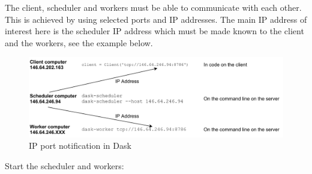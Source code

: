 The client, scheduler and workers must be able to communicate with each other. This is achieved by using selected ports and IP addresses. The main IP address of interest here is the scheduler IP address which must be made known to the client and the workers, see the example below.

\begin{figure}[htbp]
    \centering
\includegraphics[width=\textwidth]{pic/serverIP}
    \caption{IP port notification in Dask}
    \label{fig:serverIP}
\end{figure}


Start the scheduler and workers:


